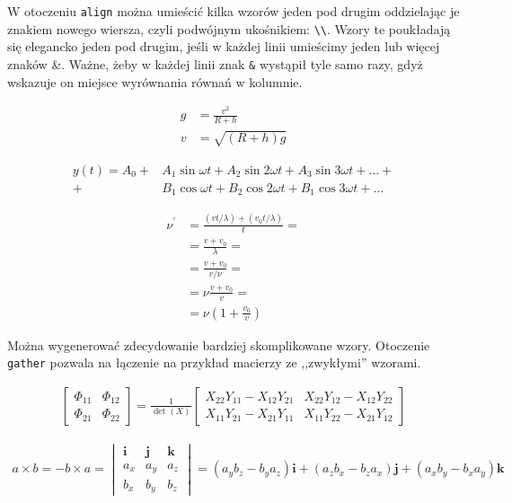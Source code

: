 W otoczeniu \texttt{align} można umieścić kilka wzorów jeden pod drugim oddzielając je znakiem nowego wiersza, czyli podwójnym ukośnikiem: \texttt{\textbackslash{}\textbackslash{}}. Wzory te poukładają się elegancko jeden pod drugim, jeśli w każdej linii umieścimy jeden lub więcej znaków \&. Ważne, żeby w każdej linii znak \texttt{\&} wystąpił tyle samo razy, gdyż wskazuje on miejsce wyrównania równań w kolumnie.

\begin{align}
    g & = \frac{v^2}{R+h} \\
    v & = \sqrt{ \left( R+h \right) g }
\end{align}

\begin{align}
 y(t) = A_0 
 +& A_1 \sin \omega t + 
    A_2 \sin 2 \omega t + 
    A_3 \sin 3 \omega t + \ldots + \nonumber \\
 +& B_1 \cos \omega t + 
    B_2 \cos 2 \omega t + 
    B_1 \cos 3 \omega t + \ldots
\end{align}

\begin{align}
 \nu^\prime  &= \frac{\left(vt / \lambda \right) + \left( v_0t / \lambda \right)}{t} = \nonumber\\
            &= \frac{v + v_0}{\lambda} = \nonumber\\
            &= \frac{v + v_0}{v / \nu} = \nonumber\\
            &= \nu \frac{v+v_0}{v} = \nonumber\\
            &= \nu \left( 1 + \frac{v_0}{v} \right)
\end{align}

Można wygenerować zdecydowanie bardziej skomplikowane wzory. Otoczenie \texttt{gather} pozwala na łączenie na przykład macierzy ze ,,zwykłymi'' wzorami.

\begin{gather}
 \begin{bmatrix} \Phi_{11} & \Phi_{12} \\ \Phi_{21} & \Phi_{22} \end{bmatrix}
 =
 \frac{1}{\det(X)}
  \begin{bmatrix}
   X_{22} Y_{11} - X_{12} Y_{21} &
   X_{22} Y_{12} - X_{12} Y_{22} \\
   X_{11} Y_{21} - X_{21} Y_{11} &
   X_{11} Y_{22} - X_{21} Y_{12} 
   \end{bmatrix}
\end{gather}

\begin{gather}
a \times b = -b \times a = 
\begin{vmatrix}
\pmb{i}    &     \pmb{j}      &      \pmb{k}    \\
a_x        &     a_y          &      a_z        \\
b_x        &     b_y          &      b_z        
\end{vmatrix}
= \left(a_y b_z - b_y a_z \right)\pmb{i} 
+ \left(a_z b_x - b_z a_x \right)\pmb{j} 
+ \left(a_x b_y - b_x a_y \right)\pmb{k} 
\end{gather}

